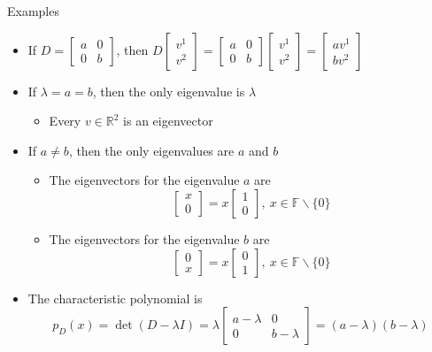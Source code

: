 \documentclass[usenames,dvipsnames,10pt]{beamer}
\newcommand\F{\mathbb{F}}
\newcommand{\R}{\mathbb{R}}
\begin{document}
\begin{frame}
  {Examples}

  \begin{itemize}
  \item If $D = \begin{bmatrix} a & 0 \\ 0 & b\end{bmatrix} $, then
    $D\begin{bmatrix} v^1\\v^2\end{bmatrix} = \begin{bmatrix} a & 0 \\ 0 & b\end{bmatrix}\begin{bmatrix} v^1\\v^2\end{bmatrix}=\begin{bmatrix} av^1 \\ bv^2 \end{bmatrix}$
  \item If $\lambda = a = b$, then the only eigenvalue is $\lambda$
    \begin{itemize}
    \item Every $v \in \R^2$ is an eigenvector
    \end{itemize}
  \item If $a \ne b$, then the only eigenvalues are $a$ and $b$
    \begin{itemize}
    \item The eigenvectors for the eigenvalue $a$ are
      \[
        \begin{bmatrix} x \\ 0 \end{bmatrix} = x\begin{bmatrix} 1 \\ 0 \end{bmatrix},\ x \in \F\backslash\{0\}
      \]
    \item The eigenvectors for the eigenvalue $b$ are
      \[
        \begin{bmatrix} 0 \\ x \end{bmatrix} = x\begin{bmatrix} 0 \\ 1 \end{bmatrix},\ x \in \F\backslash\{0\}
      \]
    \end{itemize}
  \item The characteristic polynomial is
    \[
      p_D(x) = \det(D-\lambda I)
      = \lambda\begin{bmatrix} a - \lambda & 0 \\ 0 & b-\lambda \end{bmatrix}
      = (a-\lambda)(b-\lambda)
    \]
  \end{itemize}
\end{frame}
\end{document}
